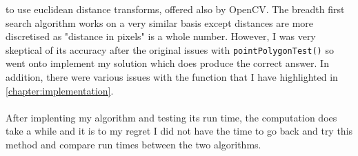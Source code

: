 \documentclass[11pt]{article}
\begin{document}
to use euclidean distance transforms, offered also by OpenCV. The breadth
first search algorithm works on a very similar basis except distances
are more discretised as "distance in pixels" is a whole number. However,
I was very skeptical of its accuracy after the original issues with
\texttt{pointPolygonTest()} so went onto implement my solution which does produce
the correct answer. In addition, there were various issues with the function
that I have highlighted in \ref{chapter:implementation}. \\
\\
After implenting my algorithm and testing its run time,
the computation does take a while and it is
to my regret I did not have the time to go back and try this method and
compare run times between the two algorithms.
\end{document}
